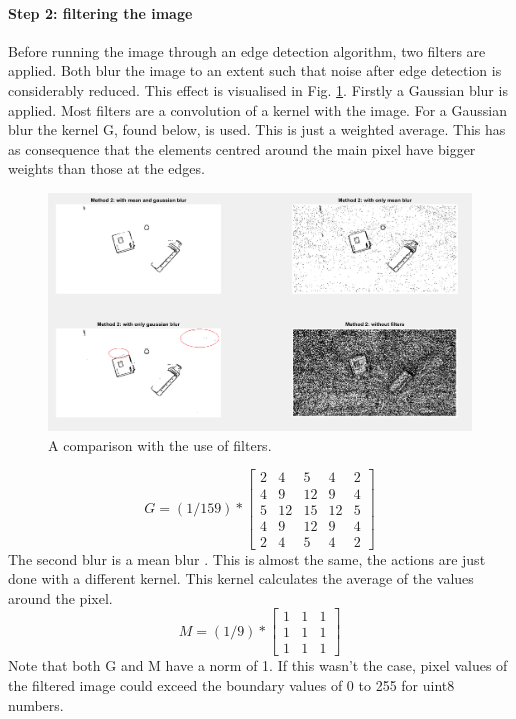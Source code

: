 \documentclass{article}
\begin{document}
\paragraph{Step 2: filtering the image}
Before running the image through an edge detection algorithm, two filters are applied. Both blur the image to an extent such that noise after edge detection is considerably reduced. This effect is visualised in Fig. \ref{fig:filter_comparison}.
Firstly a Gaussian blur\cite{gaussian} is applied. Most filters are a convolution of a kernel with the image. For a Gaussian blur the kernel G, found below, is used. This is just a weighted average. This has as consequence that the elements centred around the main pixel have bigger weights than those at the edges.
\begin{figure}[h]
\center
\includegraphics[width=0.7\linewidth]{filter_comparison.png}
\caption{A comparison with the use of filters.}
\label{fig:filter_comparison}
\end{figure}
\begin{equation}
G = (1/159) * 
\begin{bmatrix}
2 & 4 & 5 & 4 & 2\\
4 & 9 & 12 & 9 & 4\\
5 & 12 & 15 & 12 & 5\\
4 & 9 & 12 & 9& 4\\
2 & 4 & 5 & 4 & 2
\end{bmatrix}
\end{equation}
The second blur is a mean blur \cite{mean}. This is almost the same, the actions are just done with a different kernel. This kernel calculates the average of the values around the pixel.
\begin{equation}
M = (1/9) * 
\begin{bmatrix}
1&1&1\\
1&1&1\\
1&1&1
\end{bmatrix}
\end{equation}
Note that both G and M have a norm of 1. If this wasn't the case, pixel values of the filtered image could exceed the boundary values of 0 to 255 for uint8 numbers. 
\end{document}
